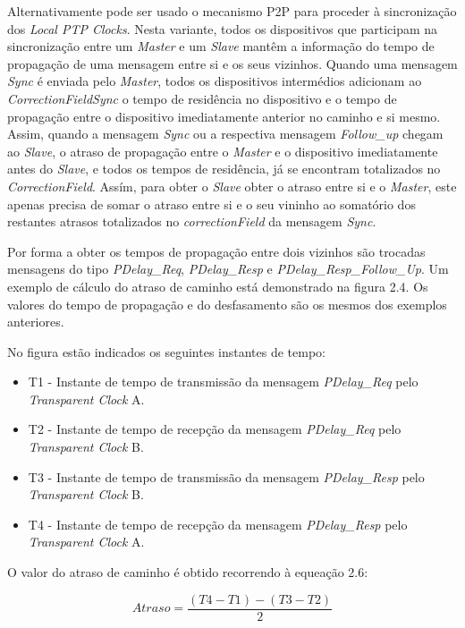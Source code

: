 Alternativamente pode ser usado o mecanismo P2P para proceder à sincronização dos \textit{Local PTP Clocks}. Nesta variante, todos os dispositivos que participam na sincronização entre um \textit{Master} e um \textit{Slave} mantêm a informação do tempo de propagação de uma mensagem entre si e os seus vizinhos. Quando uma mensagem \textit{Sync} é enviada pelo \textit{Master}, todos os dispositivos intermédios adicionam ao \textit{CorrectionFieldSync} o tempo de residência no dispositivo e o tempo de propagação entre o dispositivo imediatamente anterior no caminho e si mesmo. Assim, quando a mensagem \textit{Sync} ou a respectiva mensagem \textit{Follow\_up} chegam ao \textit{Slave}, o atraso de propagação entre o \textit{Master} e o dispositivo imediatamente antes do \textit{Slave}, e todos os tempos de residência, já se encontram totalizados no \textit{CorrectionField}. Assím, para obter o \textit{Slave} obter o atraso entre si e o \textit{Master}, este apenas precisa de somar o atraso entre si e o seu vininho ao somatório dos restantes atrasos totalizados no \textit{correctionField} da mensagem \textit{Sync}. \par 
Por forma a obter os tempos de propagação entre dois vizinhos são trocadas mensagens do tipo \textit{PDelay\_Req}, \textit{PDelay\_Resp} e \textit{PDelay\_Resp\_Follow\_Up}. Um exemplo de cálculo do atraso de caminho está demonstrado na figura 2.4. Os valores do tempo de propagação e do desfasamento são os mesmos dos exemplos anteriores. 


No figura estão indicados os seguintes instantes de tempo:

\begin{itemize}
  \item T1  - \quad Instante de tempo de transmissão da mensagem \textit{PDelay\_Req} pelo \textit{Transparent Clock} A.
  \item T2  - \quad Instante de tempo de recepção da mensagem \textit{PDelay\_Req} pelo \textit{Transparent Clock} B. 
  \item T3  - \quad Instante de tempo de transmissão da mensagem \textit{PDelay\_Resp} pelo \textit{Transparent Clock} B.
  \item T4 - \quad Instante de tempo de recepção da mensagem \textit{PDelay\_Resp} pelo \textit{Transparent Clock} A.
\end{itemize}

O valor do atraso de caminho é obtido recorrendo à equeação 2.6:

\begin{equation}
    Atraso =  \dfrac{(T4 - T1) - (T3 - T2)}{2}
\end{equation}



